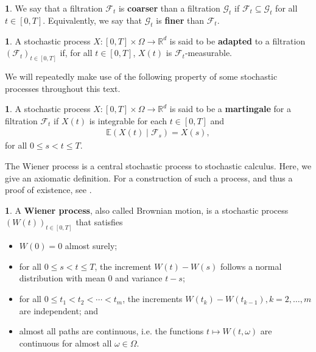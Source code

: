 \documentclass[english]{article}
\numberwithin{equation}{section}
\numberwithin{figure}{section}
\theoremstyle{bolddescit}
\theoremstyle{definition}
\newtheorem{definition}[theorem]{\protect\definitionname}
\theoremstyle{definition}
\theoremstyle{plain}
\theoremstyle{plain}
\theoremstyle{bolddesc}
\theoremstyle{plain}
\theoremstyle{remark}
\providecommand{\definitionname}{Definition}
\begin{document}
\begin{definition}
  We say that a filtration $\mathcal{F}_t$ is \textbf{coarser} than a filtration $\mathcal{G}_t$ if $\mathcal{F}_t \subseteq \mathcal{G}_t$ for all $t \in [0,T]$. Equivalently, we say that $\mathcal{G}_t$ is \textbf{finer} than $\mathcal{F}_t$.
\end{definition}

\begin{definition}
  A stochastic process $X : [0,T] \times \Omega \to \mathbb{R}^d$ is said to be \textbf{adapted} to a filtration $(\mathcal{F}_t)_{t \in [0,T]}$ if, for all $t \in [0,T]$, $X(t)$ is $\mathcal{F}_t$-measurable.
\end{definition}

We will repeatedly make use of the following property of some stochastic processes throughout this text.

\begin{definition}
  A stochastic process $X : [0,T] \times \Omega \to \mathbb{R}^d$ is said to be a \textbf{martingale} for a filtration $\mathcal{F}_t$ if $X(t)$ is integrable for each $t \in [0,T]$ and
  \begin{align*}
    \mathbb{E}(X(t) \mid \mathcal{F}_s) = X(s),
  \end{align*}
  for all $0 \le s < t \le T$.
\end{definition}

The Wiener process is a central stochastic process to stochastic calculus. Here, we give an axiomatic definition. For a construction of such a process, and thus a proof of existence, see \textcite{capinski_stochastic_2012}.

\begin{definition}
  A \textbf{Wiener process}, also called Brownian motion, is a stochastic process $(W(t))_{t \in [0,T]}$ that satisfies
  \begin{itemize}
    \item $W(0) = 0$ almost surely;
    \item for all $0 \le s < t \le T$, the increment $W(t) - W(s)$ follows a normal distribution with mean 0 and variance $t - s$;
    \item for all $0 \le t_1 < t_2 < \cdots < t_m$, the increments $W(t_k) - W(t_{k-1}), k=2,\ldots,m$ are independent; and
    \item almost all paths are continuous, i.e. the functions $t \mapsto W(t,\omega)$ are continuous for almost all $\omega \in \Omega$.
  \end{itemize}
\end{definition}
\end{document}
